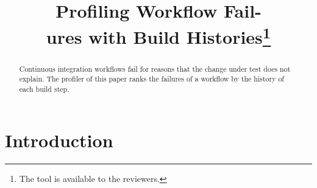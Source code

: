 \documentclass[10pt,conference]{IEEEtran}
\begin{document}
\title{Profiling Workflow Fail-\\ures with Build Histories\thanks{The tool is available to the reviewers.}}
\author{}
\maketitle
\begin{abstract}
Continuous integration workflows fail for reasons that the change under test does not explain. The profiler of this
paper ranks the failures of a workflow by the history of each build step.
\end{abstract}
\section{Introduction}
\lipsum[1-3]
\end{document}
